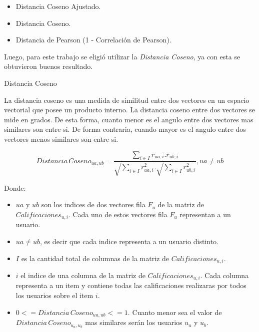 \documentclass[11pt,a4paper,twoside]{thesis}
\begin{document}
\begin{itemize}
	\item Distancia Coseno Ajustado.
	\item Distancia Coseno.
	\item Distancia de Pearson (1 - Correlación de Pearson).
\end{itemize}

Luego, para este trabajo se eligió utilizar la \textit{Distancia Coseno}, ya con esta se obtuvieron buenos resultado.

\begin{description}
	\item[Distancia Coseno]
\end{description}

La distancia coseno es una medida de similitud entre dos vectores en un espacio vectorial que posee un producto interno. La distancia coseno entre dos vectores se mide en grados. 
De esta forma, cuanto menor es el angulo entre dos vectores mas similares son entre si. De forma contraria, cuando mayor es el angulo entre dos vectores menos similares son entre si.

\begin{equation*}
	Distancia \mspace{3mu}Coseno_{ua, ub} = \frac{ \sum_{i \in I} r_{ua, i}.r_{ub, i}}{\sqrt{\sum_{i \in I} r_{ua, i}^2}.\sqrt{\sum_{i \in I} r_{ub, i}^2}  }, ua \neq ub
\end{equation*}

\begin{description}
	\item[Donde:]
\end{description}
\begin{itemize}
	\item $ua$ y $ub$ son los indices de dos vectores fila $F_u$ de la matriz de $Calificaciones_{u,i}$. Cada uno de estos vectores fila $F_u$ representan a un usuario.
 	\item $ua \neq ub$, es decir que cada indice representa a un usuario distinto.
	\item $I$ es la cantidad total de columnas de la matriz de $Calificaciones_{u,i}$.
	\item $i$ el indice de una columna de la matriz de $Calificaciones_{u,i}$. Cada columna representa a un item y contiene todas las calificaciones realizaras por todos los usuarios sobre el item $i$.
	\item $0 <= Distancia \mspace{3mu} Coseno_{ua, ub} <= 1$. Cuanto menor sea el valor de $Distancia \mspace{3mu} Coseno_{u_a, u_b}$ mas similares serán los usuarios $u_a$ y $u_b$.
\end{itemize}
\end{document}
